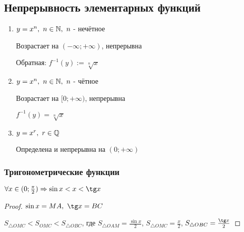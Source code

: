 \subsection{Непрерывность элементарных функций}

\begin{enumerate}
	\item $y = x^n,\ n \in \mathbb{N},\ n$ - нечётное
	
	Возрастает на $(-\infty; +\infty)$, непрерывна
	
	Обратная: $f^{-1}(y) := \sqrt[n]{x}$
	
	\item $y = x^n,\ n \in \mathbb{N},\ n$ - чётное
	
	Возрастает на $[0; +\infty)$, непрерывна
	
	$f^{-1}(y) = \sqrt[n]{x}$
	
	\item $y = x^r,\ r \in \mathbb{Q}$
	
	Определена и непрерывна на $(0; +\infty)$
\end{enumerate}

\subsubsection*{Тригонометрические функции}

\begin{lemma} \label{for_trig}
	$\forall x \in (0; \frac{\pi}{2}) \Ra \sin x < x < \tg x$
\end{lemma}


\begin{proof}
	$\sin x = MA,\ \tg x = BC$
	
	$S_{\triangle OMC} < S_{OMC} < S_{\triangle OBC}$, где $S_{\triangle OAM} = \frac{\sin x}{2}$, $S_{\triangle OMC} = \frac{x}{2}$, $S_{\triangle OBC} = \frac{\tg x}{2}$
\end{proof}